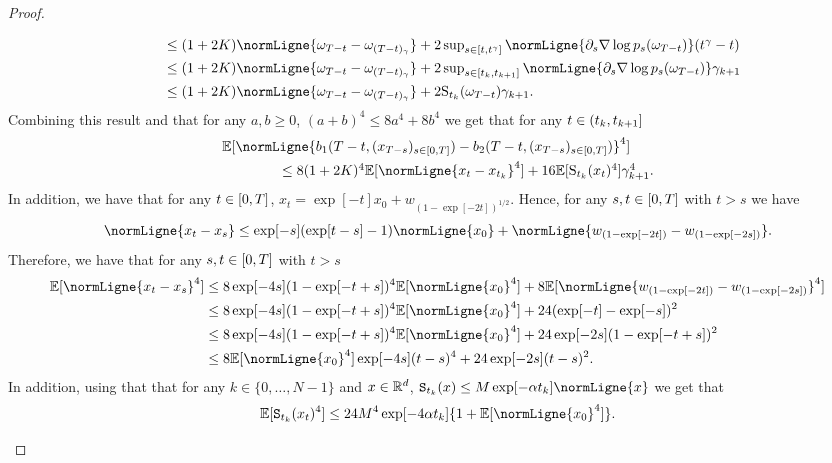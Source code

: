 \begin{proof}
\begin{enumerate}[wide, labelwidth=!, labelindent=0pt, label=(\alph*)]
\begin{align}
  & \qquad \leq \textstyle{(1 + 2 \Ktt) \normLigne{\omega_{T-t} - \omega_{(T-t)_\gamma}} + 2 \sup_{s \in \ccint{t, t^\gamma}} \normLigne{\partial_s \nabla \log p_s(\omega_{T-t})} (t^\gamma - t)} \\
                                                   & \qquad \leq \textstyle{(1 + 2 \Ktt) \normLigne{\omega_{T-t} - \omega_{(T-t)_\gamma}} + 2 \sup_{s \in \ccint{t_k, t_{k+1}}} \normLigne{\partial_s \nabla \log p_s(\omega_{T-t})} \gamma_{k+1}} \\
  & \qquad \leq \textstyle{(1 + 2 \Ktt) \normLigne{\omega_{T-t} - \omega_{(T-t)_\gamma}} + 2 \mathrm{S}_{t_{k}}(\omega_{T-t}) \gamma_{k+1}}  . 
\end{align}
Combining this result and that for any $a,b \geq 0$, $(a+b)^4 \leq 8 a^4 + 8b^4$ we get that for any $t \in \left(t_k, t_{k+1}\right]$
\begin{align}
    \label{eq:almost_there}
    &\expeLigne{\normLigne{b_1(T-t, (x_{T-s})_{s \in \ccint{0,T}})  - b_2(T-t, (x_{T-s})_{s \in \ccint{0,T}})}^4} \\
    & \qquad \qquad \leq \textstyle{8(1 + 2 \Ktt)^4 \expeLigne{\normLigne{x_{t} - x_{t_k}}^4} + 16 \expeLigne{\mathrm{S}_{t_{k}}(x_t)^4} \gamma_{k+1}^4}.
\end{align}
In addition, we have that for any $t \in \left[0,T\right]$, $x_t = \exp[-t]x_0 + w_{(1-\exp[-2t])^{1/2}}$.
Hence, for any $s,t \in \left[0,T\right]$ with $t > s$ we have
\begin{equation}
  \normLigne{x_t - x_s} \leq \exp[-s](\exp[t- s] - 1) \normLigne{x_0} + \normLigne{w_{(1-\exp[-2t])} - w_{(1-\exp[-2s])}}  . 
\end{equation}
Therefore, we have that for any $s,t \in \left[0,T\right]$ with $t > s$
\begin{align}
  \expeLigne{\normLigne{x_t - x_s}^4} &\leq 8\exp[-4s](1 - \exp[-t+s])^4 \expeLigne{\normLigne{x_0}^4} + 8 \expeLigne{\normLigne{w_{(1-\exp[-2t])} - w_{(1-\exp[-2s])}}^4} \\
                                            &\leq 8\exp[-4s](1 - \exp[-t+s])^4 \expeLigne{\normLigne{x_0}^4} + 24 (\exp[-t] - \exp[-s])^2 \\
                                            &\leq 8\exp[-4s](1 - \exp[-t+s])^4 \expeLigne{\normLigne{x_0}^4} + 24 \exp[-2s](1 - \exp[-t+s])^2 \\
  &\leq 8\expeLigne{\normLigne{x_0}^4}\exp[-4s](t-s)^4  + 24 \exp[-2s](t-s)^2  . \label{eq:inter_ou}
\end{align}
In addition, using that that for any $k \in \{0, \dots, N-1\}$ and
$x \in \mathbb{R}^d$, $\mathtt{S}_{t_k}(x) \leq \Mtt \exp[-\alpha t_k] \normLigne{x}$ we get
that
\begin{equation}
  \expeLigne{\mathtt{S}_{t_k}(x_t)^4} \leq 24 \Mtt^4 \exp[-4\alpha t_k] \{1 + \expeLigne{\normLigne{x_0}^4}\}  . 
\end{equation}


\end{enumerate}
\end{proof}
